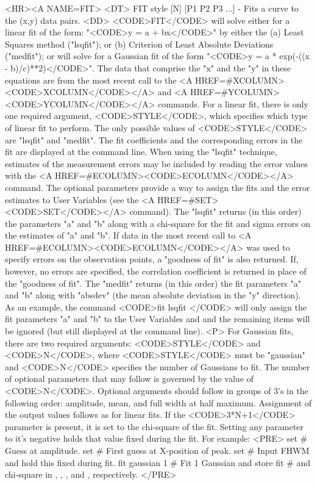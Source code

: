\begin{rawhtml}
<HR><A NAME=FIT>
<DT>
FIT style [N] [P1 P2 P3 ...] - Fits a curve to the (x,y) data pairs.
<DD>
	<CODE>FIT</CODE> will solve either for a linear fit of the form:
	"<CODE>y = a + bx</CODE>" by either the
	(a) Least Squares method ("lsqfit"); or
	(b) Criterion of Least Absolute Deviations ("medfit");
	or will solve for a Gaussian fit of the form
	"<CODE>y = a * exp(-((x - b)/c)**2)</CODE>".
	The data that comprise the "x" and the "y" in these equations are
	from the most recent call to the
	<A HREF=#XCOLUMN><CODE>XCOLUMN</CODE></A> and
	<A HREF=#YCOLUMN><CODE>YCOLUMN</CODE></A> commands.  For a
	linear fit, there is only one required argument, <CODE>STYLE</CODE>,
	which specifies which type of linear fit to perform.  The only
	possible values of <CODE>STYLE</CODE> are "lsqfit" and "medfit".
	The fit coefficients and the corresponding errors in the fit are
	displayed at the command line.  When using the "lsqfit" technique,
	estimates of the measurement errors may be included by reading the
	error values with the <A HREF=#ECOLUMN><CODE>ECOLUMN</CODE></A>
	command.  The optional parameters provide a way to assign the fits
	and the error estimates to User Variables (see the
	<A HREF=#SET><CODE>SET</CODE></A> command).  The "lsqfit" returns
	(in this order) the parameters "a" and "b" along with a chi-square
	for the fit and sigma errors on the estimates of "a" and "b".  If data
	in the most recent call to <A HREF=#ECOLUMN><CODE>ECOLUMN</CODE></A>
	was used to specify errors on the observation points, a "goodness
	of fit" is also returned.  If, however, no errors are specified,
	the correlation coefficient is returned in place of the "goodness
	of fit".  The "medfit" returns (in this order) the fit parameters
	"a" and "b" along with "absdev" (the mean absolute deviation in
	the "y" direction).  As an example, the command
	<CODE>fit lsqfit \0 \1</CODE>
	will only assign the fit parameters "a" and "b" to the User
	Variables \0 and \1 and the remaining items will be ignored (but
	still displayed at the command line).
	<P>
	For Gaussian fits, there are two required arguments:
	<CODE>STYLE</CODE> and <CODE>N</CODE>, where <CODE>STYLE</CODE>
	must be "gaussian" and <CODE>N</CODE> specifies the number of
	Gaussians to fit.  The number of optional parameters that
	may follow is governed by the value of <CODE>N</CODE>.  Optional
	arguments should follow in groups of 3's in the following order:
	amplitude, mean, and full width at half maximum.  Assignment of the
	output values follows as for linear fits.  If the <CODE>3*N+1</CODE>
	parameter is present, it is set to the chi-square of the fit.
	Setting any parameter to it's negative holds that value fixed
	during the fit.  For example:
	<PRE>
    set    # Guess at amplitude.
    set    # First guess at X-position of peak.
    set   # Input FHWM and hold this fixed during fit.
    fit gaussian 1 \1 \2 \3 \4  # Fit 1 Gaussian and store fit
          # and chi-square in \1, \2, \3, and \4, respectively.
	</PRE>


\end{rawhtml}

